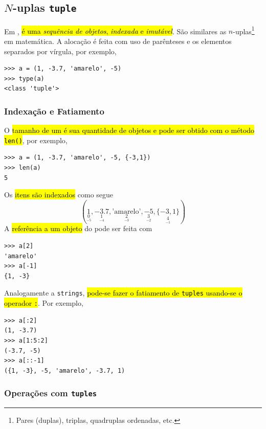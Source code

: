\subsection{$N$-uplas \texttt{tuple}}

Em \python, \hl{{\PYTHONtuple} é uma \emph{sequência de objetos}, \emph{indexada} e \emph{imutável}}. São similares as $n$-uplas\footnote{Pares (duplas), triplas, quadruplas ordenadas, etc.} em matemática. A alocação é feita com uso de parênteses e os elementos separados por vírgula, por exemplo,

\begin{lstlisting}
>>> a = (1, -3.7, 'amarelo', -5)
>>> type(a)
<class 'tuple'>
\end{lstlisting}

\subsubsection{Indexação e Fatiamento}

O \hl{tamanho de um {\PYTHONtuple} é sua quantidade de objetos e pode ser obtido com o método \texttt{len()}}, por exemplo,

\begin{lstlisting}
>>> a = (1, -3.7, 'amarelo', -5, {-3,1})
>>> len(a)
5
\end{lstlisting}

Os \hl{itens são indexados} como segue
\begin{equation}
  (\underset{\underset{-5}{0}}{1}, \underset{\underset{-4}{1}}{-3.7}, \underset{\underset{-3}{2}}{\text{'amarelo'}}, \underset{\underset{-2}{3}}{-5}, \underset{\underset{-1}{4}}{\{-3, 1\}})
\end{equation}
A \hl{referência a um objeto} do {\PYTHONtuple} pode ser feita com

\begin{lstlisting}
>>> a[2]
'amarelo'
>>> a[-1]
{1, -3}
\end{lstlisting}

Analogamente a \texttt{strings}, \hl{pode-se fazer o fatiamento de \texttt{tuples} usando-se o operador \texttt{:}}. Por exemplo,

\begin{lstlisting}
>>> a[:2]
(1, -3.7)
>>> a[1:5:2]
(-3.7, -5)
>>> a[::-1]
({1, -3}, -5, 'amarelo', -3.7, 1)
\end{lstlisting}

\subsubsection{Operações com \texttt{tuples}}

